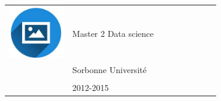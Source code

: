 \documentclass{article}
\begin{document}
\begin{paracol}{2}
 \begin{tabular}{@{}cp{0.7\linewidth}}
      \begin{minipage}{0.05\linewidth}
        \includegraphics[width=\linewidth]{picon.png}
      \end{minipage} & \vspace{-12pt}
      {\color{sidetext} {Master 2 Data science}} \\[-6pt]
      & {Sorbonne Université} \\
      & {} \\
      & {2012-2015} 
    \end{tabular}


~

~


\end{paracol}
\end{document}
